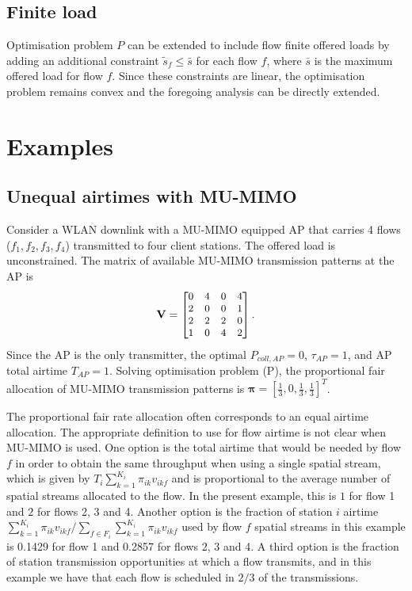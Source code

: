 \documentclass[11pt]{amsart}
\def\m#1{\mathbf{#1}}
\begin{document}
\subsection{Finite load}
Optimisation problem $P$ can be extended to include flow finite offered loads by adding an additional constraint $\tilde{s}_f \le \bar{s}$ for each flow $f$, where $\bar{s}$ is the maximum offered load for flow $f$.  Since these constraints are linear, the optimisation problem remains convex and the foregoing analysis can be directly extended.

\section{Examples}\label{sec:examples}

\subsection{Unequal airtimes with MU-MIMO} \label{ex:unequal}   Consider a WLAN downlink with a MU-MIMO equipped AP that carries 4 flows ($f_1,f_2,f_3,f_4$) transmitted to four client stations.   The offered load is unconstrained.    The matrix of available MU-MIMO transmission patterns at the AP is
\begin{align}
\small
\m{V} = \begin{bmatrix}
     0 & 4  &   0 & 4\\
     2 & 0  &   0 & 1\\
     2 & 2  &   2 & 0\\
     1 & 0  &   4 & 2
\end{bmatrix}.
\label{eq:patterns}
\end{align}
Since the AP is the only transmitter, the optimal $P_{coll,AP}=0$, $\tau_{AP}=1$, and AP total airtime $T_{AP}=1$.   Solving optimisation problem (P), the proportional fair allocation of MU-MIMO transmission patterns is $\boldsymbol \pi =  \left[\frac{1}{3}, 0, \frac{1}{3}, \frac{1}{3} \right]^T$.    

The proportional fair rate allocation often corresponds to an equal airtime allocation.  The appropriate definition to use for flow airtime is not clear when MU-MIMO is used. One option is the total airtime that would be needed by flow $f$ in order to obtain the same throughput when using a single spatial stream, which is given by $T_{i} \sum_{k=1}^{K_i} \pi_{ik}  v_{ikf}$ and is proportional to the average number of spatial streams allocated to the flow.   In the present example, this is $1$ for flow 1 and $2$ for flows 2, 3 and 4.  Another option is the fraction of station $i$ airtime $\sum_{k=1}^{K_i} \pi_{ik}  v_{ikf}/\sum_{f\in F_i} \sum_{k=1}^{K_i} \pi_{ik}  v_{ikf}$ used by flow $f$ spatial streams in this example is 0.1429 for flow 1 and 0.2857 for flows 2, 3 and 4. A third option is the fraction of station transmission opportunities at which a flow transmits, and in this example we have that each flow is scheduled in $2/3$ of the transmissions.   
\end{document}

